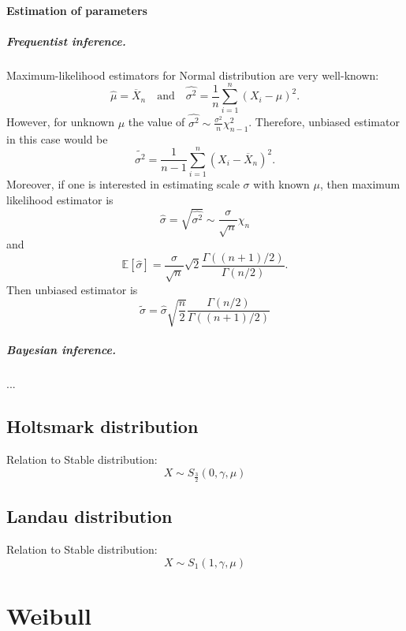 \documentclass[a4paper,11pt]{article}
\theoremstyle{plain}
\theoremstyle{definition}
\newcommand{\ME}{\mathbb{E}}
\begin{document}
\paragraph{Estimation of parameters}
\subparagraph{Frequentist inference.} Maximum-likelihood estimators for Normal distribution are very well-known:
\[
\hat{\mu} = \overline{X}_n \quad \text{and} \quad \hat{\sigma^2} = \frac{1}{n} \sum_{i=1}^{n} (X_i - \mu)^2.
\]
However, for unknown $\mu$ the value of $\hat{\sigma^2} \sim \frac{\sigma^2}{n}\chi^2_{n-1}$. Therefore, unbiased estimator in this case would be
\[
\widetilde{\sigma^2} = \frac{1}{n-1} \sum_{i=1}^{n} (X_i - \overline{X}_n)^2.
\]
Moreover, if one is interested in estimating scale $\sigma$ with known $\mu$, then maximum likelihood estimator is
\[
\hat{\sigma} = \sqrt{\hat{\sigma^2}} \sim \frac{\sigma}{\sqrt{n}} \chi_{n}
\]
and
\[
\ME[\hat{\sigma}] = \frac{\sigma}{\sqrt{n}} \sqrt{2} \frac{\Gamma((n+1)/2)}{\Gamma(n/2)}.
\]
Then unbiased estimator is
\[
\widetilde{\sigma} = \hat{\sigma} \sqrt{\frac{n}{2}} \frac{\Gamma(n/2)}{\Gamma((n+1)/2)}
\]

\subparagraph{Bayesian inference.}
...

\subsection{Holtsmark distribution}
	Relation to Stable distribution:
	\[X \sim S_{\frac{3}{2}}(0, \gamma, \mu) \]


\subsection{Landau distribution}
	Relation to Stable distribution:
	\[X \sim S_{1}(1, \gamma, \mu) \]
	
	
\pagebreak
\section{Weibull}
\end{document}
